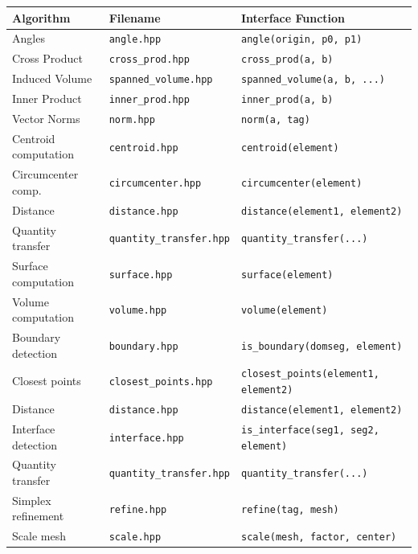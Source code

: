 \begin{table}
 \begin{tabular}{|l|l|l|}
  \hline
   Algorithm & Filename   & Interface Function\\
   \hline
   Angles         & \texttt{angle.hpp}           & \lstinline|angle(origin, p0, p1)| \\
   Cross Product  & \texttt{cross\_prod.hpp}     & \lstinline|cross_prod(a, b)| \\
   Induced Volume & \texttt{spanned\_volume.hpp} & \lstinline|spanned_volume(a, b, ...)| \\
   Inner Product  & \texttt{inner\_prod.hpp}     & \lstinline|inner_prod(a, b)|\\
   Vector Norms   & \texttt{norm.hpp}            & \lstinline|norm(a, tag)| \\
   \hline
   Centroid computation & \texttt{centroid.hpp}           & \lstinline|centroid(element)| \\
   Circumcenter comp.   & \texttt{circumcenter.hpp}       & \lstinline|circumcenter(element)| \\
   Distance             & \texttt{distance.hpp}           & \lstinline|distance(element1, element2)| \\
   Quantity transfer    & \texttt{quantity\_transfer.hpp} & \lstinline|quantity_transfer(...)|\\
   Surface computation  & \texttt{surface.hpp}            & \lstinline|surface(element)| \\
   Volume computation   & \texttt{volume.hpp}             & \lstinline|volume(element)| \\
   \hline
   Boundary detection  & \texttt{boundary.hpp}           & \lstinline|is_boundary(domseg, element)|\\
   Closest points      & \texttt{closest\_points.hpp}    & \lstinline|closest_points(element1, element2)| \\
   Distance            & \texttt{distance.hpp}           & \lstinline|distance(element1, element2)| \\
   Interface detection & \texttt{interface.hpp}          & \lstinline|is_interface(seg1, seg2, element)|\\
   Quantity transfer   & \texttt{quantity\_transfer.hpp} & \lstinline|quantity_transfer(...)|\\
   Simplex refinement  & \texttt{refine.hpp}             & \lstinline|refine(tag, mesh)| \\
   Scale mesh          & \texttt{scale.hpp}              & \lstinline|scale(mesh, factor, center)| \\

\end{tabular}
\end{table}
